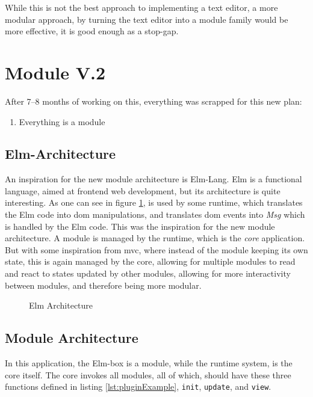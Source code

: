 While this is not the best approach to implementing a text editor, a more
modular approach, by turning the text editor into a module family would be more
effective, it is good enough as a stop-gap.

\section{Module V.2}


After 7–8 months of working on this, everything was scrapped for this new plan:

\begin{enumerate}
  \item Everything is a module
\end{enumerate}

\subsection{Elm-Architecture}

An inspiration for the new module architecture is Elm-Lang. Elm is a functional
language, aimed at frontend web development, but its architecture is quite
interesting. As one can see in figure \ref{fig:elmArchitecture}, is used by some
runtime, which translates the Elm code into \gls{dom} manipulations, and translates
\gls{dom} events into \textit{Msg} which is handled by the Elm code. This was the
inspiration for the new module architecture. A module is managed by the runtime,
which is the \textit{core} application. But with some inspiration from
\gls{mvc}, where instead of the module keeping its own state, this is again
managed by the core, allowing for multiple modules to read and react to states
updated by other modules, allowing for more interactivity between modules, and
therefore being more modular.

\begin{figure}
  \centering
  
  \caption{Elm Architecture}
  \label{fig:elmArchitecture}
\end{figure}

\subsection{Module Architecture}

In this application, the Elm-box is a module, while the runtime system, is the
core itself. The core invokes all modules, all of which, should have these three
functions defined in listing \ref{lst:pluginExample}, \lstinline{init},
\lstinline{update}, and \lstinline{view}.

